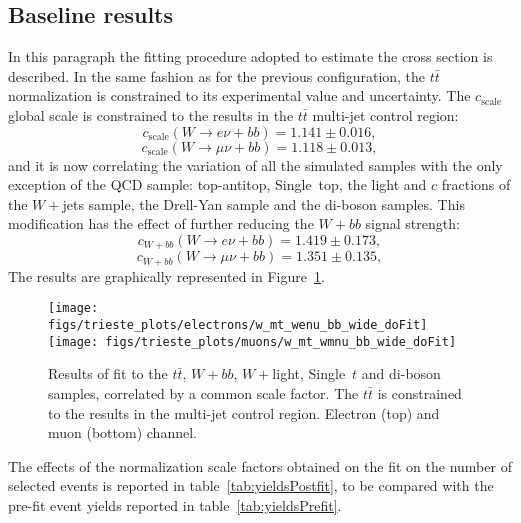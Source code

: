 \subsection{Baseline results}
In this paragraph the fitting procedure adopted to estimate the
cross section is described.
In the same fashion as for the previous configuration,
the $t\bar{t}$ normalization is constrained to its experimental
value and uncertainty.
The $c_{\mathrm{scale}}$ global scale is constrained to the
results in the $t\bar{t}$ multi-jet control region:
$$c_{\mathrm{scale}}(W \rightarrow e \nu + bb) = 1.141 \pm 0.016 \mathrm{,}$$
$$c_{\mathrm{scale}}(W \rightarrow \mu \nu + bb) = 1.118 \pm 0.013 \mathrm{,}$$
and it is now correlating the
variation of all the simulated samples with the only exception
of the QCD sample: top-antitop, Single~top, the light and $c$ fractions
of the $W+$jets sample, the Drell-Yan sample and the di-boson samples.
This modification has the effect of further reducing the
$W+bb$ signal strength:
$$c_{W+bb}(W \rightarrow e \nu + bb) = 1.419 \pm 0.173 \mathrm{,}$$
$$c_{W+bb}(W \rightarrow \mu \nu + bb) = 1.351 \pm 0.135 \mathrm{,}$$
The results are graphically represented in Figure~\ref{fig:baselinefit}.
\begin{figure}[htb]
        \begin{center}
                \leavevmode
                \texttt{[image: figs/trieste\_plots/electrons/w\_mt\_wenu\_bb\_wide\_doFit]}
                \texttt{[image: figs/trieste\_plots/muons/w\_mt\_wmnu\_bb\_wide\_doFit]}
        \end{center}
        \caption{Results of fit to the $t\bar{t}$, $W+bb$, $W+$light, Single~$t$ and
          di-boson samples, correlated by
          a common scale factor. The $t\bar{t}$ is constrained to the results
          in the multi-jet control region. Electron (top) and
          muon (bottom) channel.}
        \label{fig:baselinefit}
\end{figure}
The effects of the normalization scale factors obtained on the fit
on the number of selected events is reported in table~\ref{tab:yieldsPostfit},
to be compared with the pre-fit event yields reported in
table~\ref{tab:yieldsPrefit}.
